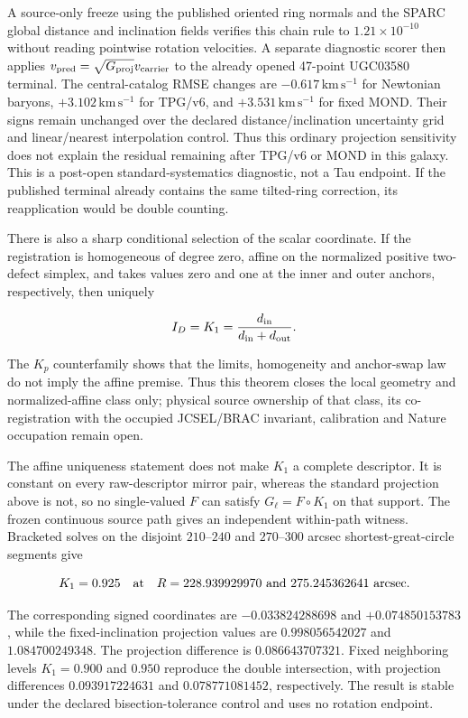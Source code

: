 \documentclass[11pt]{article}
\begin{document}
A source-only freeze using the published oriented ring normals and the SPARC
global distance and inclination fields verifies this chain rule to
$1.21\times10^{-10}$ without reading pointwise rotation velocities.  A
separate diagnostic scorer then applies
$v_{\rm pred}=\sqrt{G_{\rm proj}}v_{\rm carrier}$ to the already opened
47-point UGC03580 terminal.  The central-catalog RMSE changes are
$-0.617\,\mathrm{km\,s^{-1}}$ for Newtonian baryons,
$+3.102\,\mathrm{km\,s^{-1}}$ for TPG/v6, and
$+3.531\,\mathrm{km\,s^{-1}}$ for fixed MOND.  Their signs remain unchanged
over the declared distance/inclination uncertainty grid and linear/nearest
interpolation control.  Thus this ordinary projection sensitivity does not
explain the residual remaining after TPG/v6 or MOND in this galaxy.  This is a
post-open standard-systematics diagnostic, not a Tau endpoint.  If the
published terminal already contains the same tilted-ring correction, its
reapplication would be double counting.

There is also a sharp conditional selection of the scalar coordinate.  If the
registration is homogeneous of degree zero, affine on the normalized positive
two-defect simplex, and takes values zero and one at the inner and outer
anchors, respectively, then uniquely

\[
I_D=K_1=\frac{d_{\rm in}}{d_{\rm in}+d_{\rm out}}.
\]

The $K_p$ counterfamily shows that the limits, homogeneity and anchor-swap
law do not imply the affine premise.  Thus this theorem closes the local
geometry and normalized-affine class only; physical source ownership of that
class, its co-registration with the occupied JCSEL/BRAC invariant, calibration
and Nature occupation remain open.

The affine uniqueness statement does not make $K_1$ a complete descriptor.
It is constant on every raw-descriptor mirror pair, whereas the standard
projection above is not, so no single-valued $F$ can satisfy
$G_\ell=F\circ K_1$ on that support.  The frozen continuous source path gives
an independent within-path witness.  Bracketed solves on the disjoint
$210$--$240$ and $270$--$300$ arcsec shortest-great-circle segments give

\[
K_1=0.925
\quad\hbox{at}\quad
R=228.939929970\ \hbox{and}\ 275.245362641\ \mathrm{arcsec}.
\]

The corresponding signed coordinates are $-0.033824288698$ and
$+0.074850153783$, while the fixed-inclination projection values are
$0.998056542027$ and $1.084700249348$.  The projection difference is
$0.086643707321$.  Fixed neighboring levels $K_1=0.900$ and $0.950$ reproduce
the double intersection, with projection differences $0.093917224631$ and
$0.078771081452$, respectively.  The result is stable under the declared
bisection-tolerance control and uses no rotation endpoint.
\end{document}

